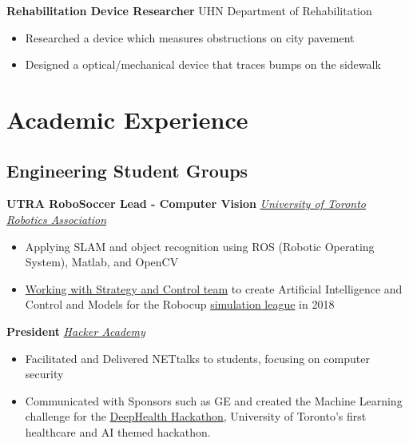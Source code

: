 \documentclass[10pt, a4paper]{cv}
\begin{document}
	\textbf{Rehabilitation Device Researcher} \hfill UHN Department of Rehabilitation
	\begin{itemize}
		\item Researched a device which measures obstructions on city pavement
		\item Designed a optical/mechanical device that traces bumps on the sidewalk
	\end{itemize}

\section*{Academic Experience}

\subsection*{Engineering Student Groups}\noindent

	\textbf{UTRA RoboSoccer Lead - Computer Vision} \hfill \emph{\href{http://www.utra.ca}{University of Toronto Robotics Association}}
	\begin{itemize}
		\item Applying SLAM and object recognition using ROS (Robotic Operating System), Matlab, and OpenCV
		\item \href{https://github.com/utra-robosoccer/soccerbot}{Working with Strategy and Control team} to create Artificial Intelligence and Control and Models for the Robocup \href{http://wiki.robocup.org/Soccer_Simulation_League}{simulation league} in 2018
	\end{itemize}
	
	\textbf{President} \hfill \emph{\href{http://hackeracademy.org}{Hacker Academy}}
	\begin{itemize}
		\item Facilitated and Delivered NETtalks to students, focusing on computer security
		\item Communicated with Sponsors such as GE and created the Machine Learning challenge for the \href{http://deephealth.ca}{DeepHealth Hackathon}, University of Toronto's first healthcare and AI themed hackathon.
	\end{itemize}
	
\end{document}

